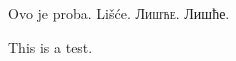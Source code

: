 \documentclass[a4paper]{article}
\begin{document}
Ovo je proba. Lišće. \textsc{Лишће}. Лишће.
\begin{english}
This is a test.
\end{english}
\end{document}
